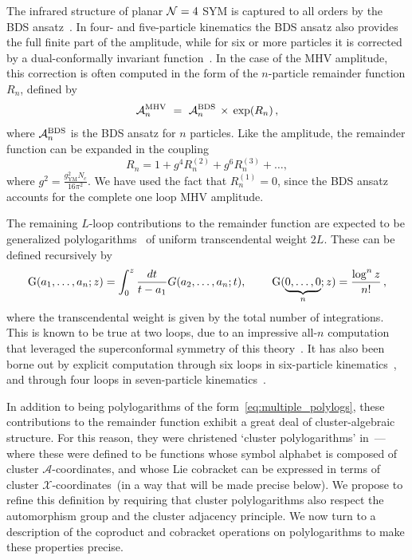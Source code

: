 \documentclass[11pt]{article}
\def\xcoords{$\mathcal{X}$-coordinates}
\def\acoords{$\mathcal{A}$-coordinates}
\begin{document}
The infrared structure of planar ${\cal N} = 4$ SYM is captured to all orders by the BDS ansatz~\cite{}. In four- and five-particle kinematics the BDS ansatz also provides the full finite part of the amplitude, while for six or more particles it is corrected by a dual-conformally invariant function~\cite{}. In the case of the MHV amplitude, this correction is often computed in the form of the $n$-particle remainder function $R_n$, defined by
\begin{equation}
\mathcal{A}_n^{\rm MHV}\ =\ \mathcal{A}_n^{\rm BDS} \, \times \, \exp(R_n)\,,
\end{equation}
where $\mathcal{A}_n^{\rm BDS}$ is the BDS ansatz for $n$ particles. Like the amplitude, the remainder function can be expanded in the coupling
\begin{equation}
R_n = 1 + g^4 R_n^{(2)} + g^6 R_n^{(3)} + \dots ,
\end{equation}
where $g^2 = \frac{g_{\text{YM}}^2 N_c}{16 \pi^2}$. We have used the fact that $R_n^{(1)} = 0$, since the BDS ansatz accounts for the complete one loop MHV amplitude. 

The remaining $L$-loop contributions to the remainder function are expected to be generalized polylogarithms~\cite{Chen,FBThesis,Gonch} of uniform transcendental weight $2L$. These can be defined recursively by
\begin{equation} \label{eq:multiple_polylogs}
\text{G}(a_1, \dots, a_n; z) = \int_0^z \frac{dt}{t-a_1} G(a_2,\dots,a_n; t), \hspace{0.8cm} \text{G}(\underbrace{0,\dots,0}_n;z) = \frac{\log^n z}{n!}\, ,
\end{equation}
where the transcendental weight is given by the total number of integrations. This is known to be true at two loops, due to an impressive all-$n$ computation that leveraged the superconformal symmetry of this theory~\cite{CaronHuot:2011ky}. It has also been borne out by explicit computation through six loops in six-particle kinematics~\cite{}, and through four loops in seven-particle kinematics~\cite{Dixon:2016nkn}.

In addition to being polylogarithms of the form~\eqref{eq:multiple_polylogs}, these contributions to the remainder function exhibit a great deal of cluster-algebraic structure. For this reason, they were christened `cluster polylogarithms' in~\cite{Golden:2014xqa}---where these were defined to be functions whose symbol alphabet is composed of cluster \acoords, and whose Lie cobracket can be expressed in terms of cluster \xcoords\ (in a way that will be made precise below). We propose to refine this definition by requiring that cluster polylogarithms also respect the automorphism group and the cluster adjacency principle. We now turn to a description of the coproduct and cobracket operations on polylogarithms to make these properties precise. 
\end{document}
